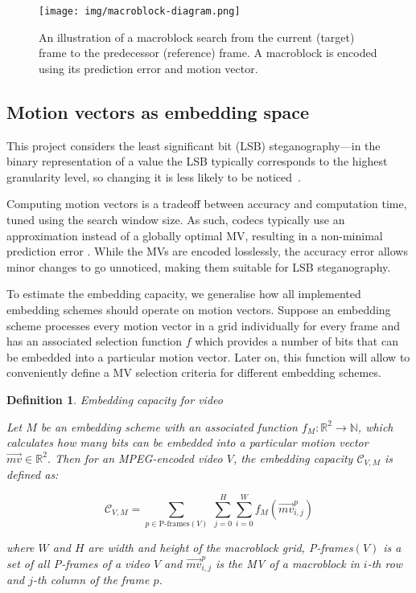 \documentclass[12pt,british,twoside,notitlepage,usenames,dvipsnames,hypens,final]{report}
\newtheorem{definition}{Definition}
\numberwithin{equation}{section}
\numberwithin{figure}{section}
\begin{document}
\begin{figure}[tbh]
\centerline{\texttt{[image: img/macroblock-diagram.png]}}
\caption{An illustration of a macroblock search from the current (target) frame to the predecessor (reference) frame. A macroblock is encoded using its prediction error and  motion vector.}
\label{fig:mb-search}
\end{figure} 

\subsection{Motion vectors as embedding space}
\label{mv-emb-space}

This project considers the least significant bit (LSB) steganography---in the binary representation of a value the LSB typically corresponds to the highest granularity level, so changing it is less likely to be noticed~\cite{bateman}.

Computing motion vectors is a tradeoff between accuracy and computation time, tuned using the search window size. As such, codecs typically use an approximation instead of a globally optimal MV, resulting in a non-minimal prediction error \cite[p.~257]{richardson2004h}. While the MVs are encoded losslessly, the accuracy error allows minor changes to go unnoticed, making them suitable for LSB steganography.

To estimate the embedding capacity, we generalise how all implemented embedding schemes should operate on motion vectors. Suppose an embedding scheme processes every motion vector in a grid individually for every frame and has an associated selection function $f$ which provides a number of bits that can be embedded into a particular motion vector. Later on, this function will allow to conveniently define a MV selection criteria for different embedding schemes.

\begin{definition}{Embedding capacity for video}

Let $M$ be an embedding scheme with an associated function $f_M : \mathbb{R}^2 \rightarrow \mathbb{N}$, which calculates how many bits can be embedded into a particular motion vector $\overrightarrow{mv} \in \mathbb{R}^2$. Then for an MPEG-encoded video $V$, the embedding capacity $\mathcal{C}_{V, M}$ is defined as:

$$ \mathcal{C}_{V, M} = \sum_{p \in \text{P-frames}(V)} \: \sum^{H}_{j = 0} \sum^{W}_{i = 0} f_M(\overrightarrow{mv}^p_{i, j})$$

where $W$ and $H$ are width and height of the macroblock grid, P-frames$(V)$ is a set of all P-frames of a video $V$ and $\overrightarrow{mv}^p_{i, j}$ is the MV of a macroblock  in $i$-th row and $j$-th column of the frame $p$.

\end{definition}
\end{document}
